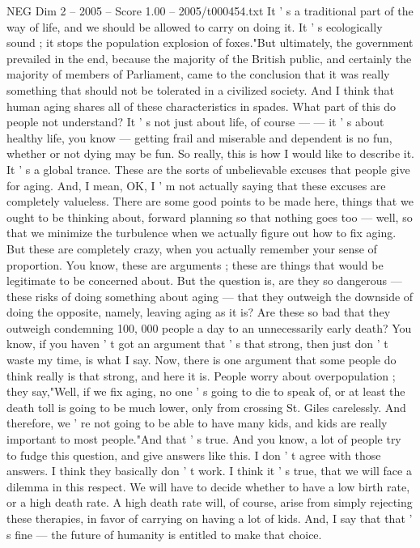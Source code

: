 \begin{textsample}{NEG Dim 2 – 2005 – Score 1.00 – 2005/t000454.txt}
It ' s a traditional part of the way of life, and we should be allowed to carry on doing it.
It ' s ecologically sound ; it stops the population explosion of foxes."But ultimately, the government prevailed in the end, because the majority of the British public, and certainly the majority of members of Parliament, came to the conclusion that it was really something that should not be tolerated in a civilized society.
And I think that human aging shares all of these characteristics in spades.
What part of this do people not understand?
It ' s not just about life, of course — — it ' s about healthy life, you know — getting frail and miserable and dependent is no fun, whether or not dying may be fun.
So really, this is how I would like to describe it.
It ' s a global trance.
These are the sorts of unbelievable excuses that people give for aging.
And, I mean, OK, I ' m not actually saying that these excuses are completely valueless.
There are some good points to be made here, things that we ought to be thinking about, forward planning so that nothing goes too — well, so that we minimize the turbulence when we actually figure out how to fix aging.
But these are completely crazy, when you actually remember your sense of proportion.
You know, these are arguments ; these are things that would be legitimate to be concerned about.
But the question is, are they so dangerous — these risks of doing something about aging — that they outweigh the downside of doing the opposite, namely, leaving aging as it is?
Are these so bad that they outweigh condemning 100, 000 people a day to an unnecessarily early death?
You know, if you haven ' t got an argument that ' s that strong, then just don ' t waste my time, is what I say.
Now, there is one argument that some people do think really is that strong, and here it is.
People worry about overpopulation ; they say,"Well, if we fix aging, no one ' s going to die to speak of, or at least the death toll is going to be much lower, only from crossing St.
Giles carelessly.
And therefore, we ' re not going to be able to have many kids, and kids are really important to most people."And that ' s true.
And you know, a lot of people try to fudge this question, and give answers like this.
I don ' t agree with those answers.
I think they basically don ' t work.
I think it ' s true, that we will face a dilemma in this respect.
We will have to decide whether to have a low birth rate, or a high death rate.
A high death rate will, of course, arise from simply rejecting these therapies, in favor of carrying on having a lot of kids.
And, I say that that ' s fine — the future of humanity is entitled to make that choice.

\end{textsample}

